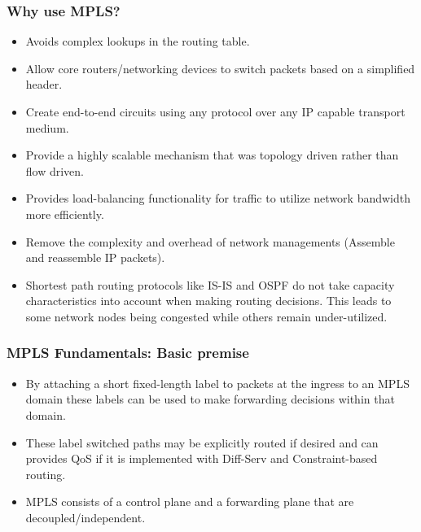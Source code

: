 \documentclass[12pt]{beamer}
\begin{document}
\begin{frame}
  \frametitle{Why use MPLS?}
	\begin{itemize}
        \item Avoids complex lookups in the routing table.
		\item Allow core routers/networking devices to switch packets based on a simplified header.
        \item Create end-to-end circuits using any protocol over any IP capable transport medium.
		\item Provide a highly scalable mechanism that was topology driven rather than flow driven.
		\item Provides load-balancing functionality for traffic to utilize network bandwidth more efficiently.
		\item Remove the complexity and overhead of network managements (Assemble and reassemble IP packets).		
        \item Shortest path routing protocols like IS-IS and OSPF do not take capacity characteristics into account when making routing decisions. This leads to some network nodes being congested while others remain under-utilized.
	\end{itemize}
\end{frame}

\begin{frame}
    \frametitle{MPLS Fundamentals: Basic premise}
    \begin{itemize}
        \item By attaching a short fixed-length label to packets at the ingress to an MPLS domain these labels can be used to make forwarding decisions within that domain.
        \item These label switched paths may be explicitly routed if desired and can provides QoS if it is implemented with Diff-Serv and Constraint-based routing.
        \item MPLS consists of a control plane and a forwarding plane that are decoupled/independent.
    \end{itemize}
\end{frame}
\end{document}
